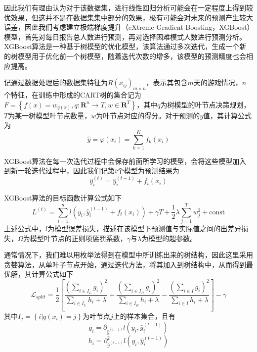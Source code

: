 \documentclass{MathModeling}
\begin{document}
	因此我们有理由认为对于该数据集，进行线性回归分析可能会在一定程度上得到较优效果，但这并不是在数据集集中部分的效果，极有可能会对未来的预测产生较大误差，因此我们考虑建立极端梯度提升（eXtreme Gradient Boosting，XGBoost）模型，首先对每日报告总人数进行预测，再对选择困难模式人数进行预测分析。
	XGBoost算法是一种基于树模型的优化模型，该算法通过多次迭代，生成一个新的树模型用于优化前一个树模型，随着迭代次数的增多，该模型的预测精度也会相应提高\textcolor{blue}{\cite{pxgboost1}}。

		记通过数据处理后的数据集特征为$R\left(x_{ij}\right)_{m\times n}$，表示其包含$m$天的游戏情况，$n$个特征，在训练中形成的CART树的集合记为$F=\left\{f\left(x\right)=w_{q\left(x\right)},q:\mathbf{R}^n\to T,w\in \mathbf{R}^T\right\}$，其中$q$为树模型的叶节点决策规划，$T$为某一树模型叶节点数量，$w$为叶节点对应的得分\textcolor{blue}{\cite{pxgboost2}}。对于预测的$y$值，其计算公式为
		\begin{equation}
			\hat{y}=\varphi \left( x_i \right) =\sum\limits_{k=1}^K{f_k\left( x_i \right)} \label{fXGBoostypre}
		\end{equation}
	
		XGBoost算法在每一次迭代过程中会保存前面所学习的模型，会将这些模型加入到新一轮迭代过程中，因此我们记第$i$个模型为预测结果为
		\begin{equation}
			\hat{y}_{i}^{\left(t\right)}=\hat{y}_{i}^{\left(t-1\right)}+f_t\left(x_i\right) \label{fXGBoostyprei}
		\end{equation}
		
		XGBoost算法的目标函数计算公式如下
		\begin{equation}
			L^{\left(t\right)}=\sum\limits_{i=1}^{n}l\left(y_i,\hat{y}_{i}^{\left(t-1\right)}+f_t\left(x_i\right)\right)+\gamma T+\frac{1}{2}\lambda\sum\limits_{j=1}^T{w_j^2}+\mathrm{const} \label{fXGBoostL}
		\end{equation}
		上述公式中，$l$为模型误差损失，描述在该模型下预测值与实际值之间的出差异损失，$\Omega$为模型叶节点的正则项惩罚系数，$\gamma$与$\lambda$为模型的超参数\textcolor{blue}{\cite{pxgboost2}}。
		
		通常情况下，我们难以用枚举法得到在模型中所训练出来的树结构，因此这里采用贪婪算法，从单叶子节点开始，通过迭代方法，将其加入到树结构中，从而得到最优解，其计算公式\textcolor{blue}{\cite{pxgboost3}}如下
		\begin{equation}
			\mathcal{L}_{split}=\frac{1}{2}\left[\frac{\left(\sum_{i\in I_L}g_i\right)^2}{\sum_{i\in I_L}h_i+\lambda}+\frac{\left(\sum_{i\in I_R}g_i\right)^2}{\sum_{i\in I_R}h_i+\lambda}-\frac{\left(\sum_{i\in I}g_i\right)^2}{\sum_{i\in I}h_i+\lambda}\right]-\gamma \label{fXGBoostLsplit}
		\end{equation}
		其中$I_j=\left\{i|q\left(x_i\right)=j\right\}$为叶节点$j$上的样本集合\textcolor{blue}{\cite{pxgboost2}}，且有
		\begin{equation}
			g_i=\partial_{\hat{y}^{\left(t-1\right)}}l\left(y_i,\hat{y}_i^{\left(t-1\right)}\right)
		\end{equation}
		\begin{equation}
			h_i=\partial_{\hat{y}^{\left(t-1\right)}}^2l\left(y_i,\hat{y}_i^{\left(t-1\right)}\right)
		\end{equation}
\end{document}
